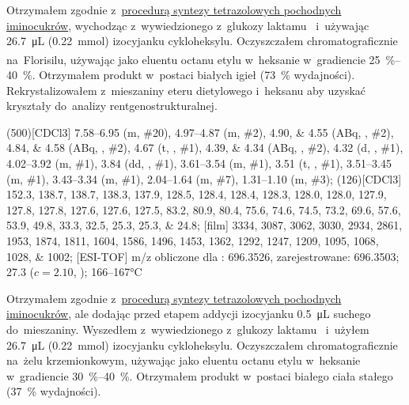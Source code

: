 Otrzymałem zgodnie z~\hyperref[experimental:sugars:schwartz]{procedurą syntezy tetrazolowych
  pochodnych iminocukrów}, wychodząc z~wywiedzionego z~glukozy laktamu~
  i~używając \SI{26.7}{\micro\liter} (\SI{0.22}{\milli\mol}) izocyjanku cykloheksylu.
Oczyszczałem chromatograficznie na~Florisilu\textsuperscript{\textregistered},
  używając jako eluentu octanu etylu w~heksanie w~gradiencie \SIrange{25}{40}{\percent}.
Otrzymałem produkt w~postaci białych igieł (\SI{73}{\percent} wydajności).
Rekrystalizowałem z~mieszaniny eteru dietylowego i~heksanu aby uzyskać kryształy
  do~analizy rentgenostrukturalnej.

\begin{fullexp}
  \NMR(500)[CDCl3] \numrange{7.58}{6.95} (m, \#{20}), \numrange{4.97}{4.87} (m, \#{2}), \numlist{4.90;4.55} (ABq, , \#{2}), \numlist{4.84;4.58} (ABq, , \#{2}), \num{4.67} (t, , \#{1}), \numlist{4.39;4.34} (ABq, , \#{2}), \num{4.32} (d, , \#{1}), \numrange{4.02}{3.92} (m, \#{1}), \num{3.84} (dd, , \#{1}), \numrange{3.61}{3.54} (m, \#{1}), \num{3.51} (t, , \#{1}), \numrange{3.51}{3.45} (m, \#{1}), \numrange{3.43}{3.34} (m, \#{1}), \numrange{2.04}{1.64} (m, \#{7}), \numrange{1.31}{1.10} (m, \#{3});
  (126)[CDCl3] \numlist{152.3; 138.7; 138.7; 138.3; 137.9; 128.5; 128.4; 128.4; 128.3; 128.0; 128.0; 127.9; 127.8; 127.8; 127.6; 127.6; 127.5; 83.2; 80.9; 80.4; 75.6; 74.6; 74.5; 73.2; 69.6; 57.6; 53.9; 49.8; 33.3; 32.5; 25.3; 25.3; 24.8};
  [film] \numlist{3334; 3087; 3062; 3030; 2934; 2861; 1953; 1874; 1811; 1604; 1586; 1496; 1453; 1362; 1292; 1247; 1209; 1095; 1068; 1028; 1002};
  [ESI-TOF] m/z obliczone dla : \num{696.3526}, zarejestrowane: \num{696.3503};
  \data{[$\alpha^{23}_D$]~$=$} \num{27.3} ($c = 2.10$, );
   \numrange{166}{167}\si{\celsius}
\end{fullexp}

Otrzymałem zgodnie z~\hyperref[experimental:sugars:schwartz]{procedurą syntezy tetrazolowych
  pochodnych iminocukrów}, ale dodając przed etapem addycji izocyjanku
  \SI{0.5}{\micro\liter} suchego  do~mieszaniny.
Wyszedłem z~wywiedzionego z~glukozy laktamu~
  i~użyłem \SI{26.7}{\micro\liter} (\SI{0.22}{\milli\mol}) izocyjanku cykloheksylu.
Oczyszczałem chromatograficznie na~żelu krzemionkowym,
  używając jako eluentu octanu etylu w~heksanie w~gradiencie \SIrange{30}{40}{\percent}.
Otrzymałem produkt w~postaci białego ciała stałego (\SI{37}{\percent} wydajności).

